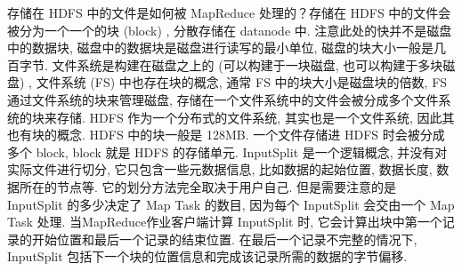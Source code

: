 存储在 HDFS 中的文件是如何被 MapReduce 处理的？存储在 HDFS 中的文件会被分为一个一个的块 (block) , 分散存储在 datanode 中. 注意此处的快并不是磁盘中的数据块, 磁盘中的数据块是磁盘进行读写的最小单位, 磁盘的块大小一般是几百字节. 文件系统是构建在磁盘之上的 (可以构建于一块磁盘, 也可以构建于多块磁盘) , 文件系统 (FS) 中也存在块的概念, 通常 FS 中的块大小是磁盘块的倍数, FS 通过文件系统的块来管理磁盘, 存储在一个文件系统中的文件会被分成多个文件系统的块来存储. HDFS 作为一个分布式的文件系统, 其实也是一个文件系统, 因此其也有块的概念. HDFS 中的块一般是 128MB. 一个文件存储进 HDFS 时会被分成多个 block, block 就是 HDFS 的存储单元. InputSplit 是一个逻辑概念, 并没有对实际文件进行切分, 它只包含一些元数据信息, 比如数据的起始位置, 数据长度, 数据所在的节点等. 它的划分方法完全取决于用户自己. 但是需要注意的是 InputSplit 的多少决定了 Map Task 的数目, 因为每个 InputSplit 会交由一个 Map Task 处理. 当MapReduce作业客户端计算 InputSplit 时, 它会计算出块中第一个记录的开始位置和最后一个记录的结束位置. 在最后一个记录不完整的情况下, InputSplit 包括下一个块的位置信息和完成该记录所需的数据的字节偏移. 